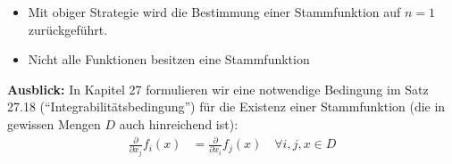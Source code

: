 \begin{remark}
	\vspace*{0pt}
	\begin{itemize}
		\item Mit obiger Strategie wird die Bestimmung einer Stammfunktion auf $n=1$ zurückgeführt.
		\item Nicht alle Funktionen besitzen eine Stammfunktion
	\end{itemize}
\end{remark}

\textbf{Ausblick:} In Kapitel 27 formulieren wir eine notwendige Bedingung im Satz 27.18 ("`Integrabilitätsbedingung"') für die Existenz einer Stammfunktion (die in gewissen Mengen $D$ auch hinreichend ist): \begin{align*}
		\frac{\partial}{\partial x_j} f_i(x) &= \frac{\partial}{\partial x_i} f_j(x) \quad \forall i,j,x\in D
	\end{align*}